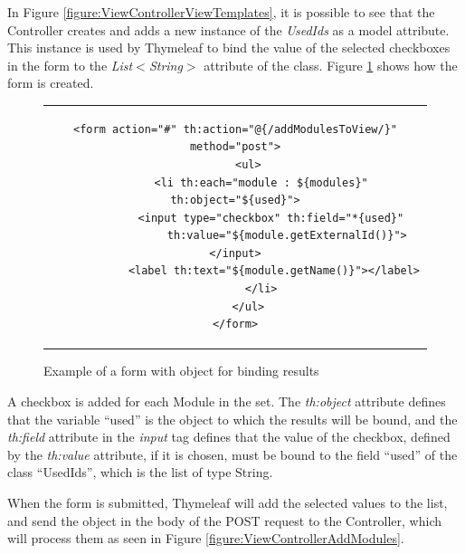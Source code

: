 In Figure \ref{figure:ViewControllerViewTemplates}, it is possible to see that the Controller creates and adds a new instance of the \textit{UsedIds} as a model attribute. This instance is used by Thymeleaf to bind the value of the selected checkboxes in the form to the \textit{List$<$String$>$} attribute of the class. Figure \ref{figure:viewFormBindingResult} shows how the form is created.
\begin{figure}[h]
\centering
\lstset{style=customhtml}
\begin{tabular}{c}
\begin{lstlisting}
<form action="#" th:action="@{/addModulesToView/}" method="post">
	<ul>
		<li th:each="module : ${modules}" th:object="${used}">
			<input type="checkbox" th:field="*{used}" 
				th:value="${module.getExternalId()}"></input>
			<label th:text="${module.getName()}"></label>
		</li>
	</ul>
</form>
\end{lstlisting}
\end{tabular}
\caption{Example of a form with object for binding results}
\label{figure:viewFormBindingResult}
\end{figure}
A checkbox is added for each Module in the set. The \textit{th:object} attribute defines that the variable ``used'' is the object to which the results will be bound, and the \textit{th:field} attribute in the \textit{input} tag defines that the value of the checkbox, defined by the \textit{th:value} attribute, if it is chosen, must be bound to the field ``used'' of the class ``UsedIds'', which is the list of type String.

When the form is submitted, Thymeleaf will add the selected values to the list, and send the object in the body of the POST request to the Controller, which will process them as seen in Figure \ref{figure:ViewControllerAddModules}.
					
					













